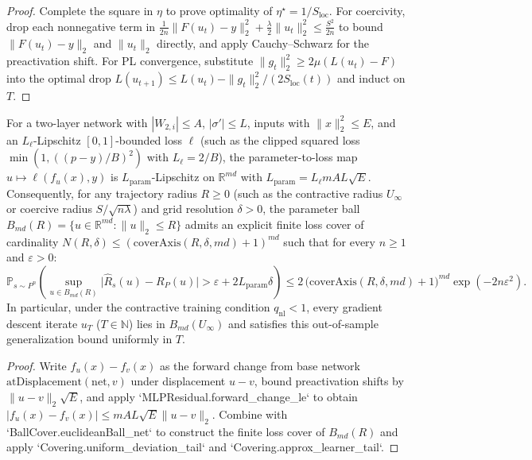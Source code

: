 \begin{proof}
\leanok
Complete the square in $\eta$ to prove optimality of $\eta^\star = 1/S_{\mathrm{loc}}$. For coercivity, drop each nonnegative term in $\frac{1}{2n}\|F(u_t)-y\|_2^2 + \frac{\lambda}{2}\|u_t\|_2^2 \le \frac{S^2}{2n}$ to bound $\|F(u_t)-y\|_2$ and $\|u_t\|_2$ directly, and apply Cauchy--Schwarz for the preactivation shift. For PL convergence, substitute $\|g_t\|_2^2 \ge 2\mu(L(u_t)-F)$ into the optimal drop $L(u_{t+1}) \le L(u_t) - \|g_t\|_2^2/(2 S_{\mathrm{loc}}(t))$ and induct on $T$.
\end{proof}

\begin{lemma}\label{lem:trajectory_generalization}
\leanok
{}
For a two-layer network with $|W_{2,i}|\le A$, $|\sigma'|\le L$, inputs with $\|x\|_2^2\le E$, and an $L_\ell$-Lipschitz $[0,1]$-bounded loss $\ell$ (such as the clipped squared loss $\min(1, ((p-y)/B)^2)$ with $L_\ell = 2/B$), the parameter-to-loss map $u\mapsto \ell(f_{u}(x), y)$ is $L_{\mathrm{param}}$-Lipschitz on $\mathbb{R}^{md}$ with $L_{\mathrm{param}} = L_\ell m A L\sqrt{E}$. Consequently, for any trajectory radius $R\ge 0$ (such as the contractive radius $U_\infty$ or coercive radius $S/\sqrt{n\lambda}$) and grid resolution $\delta>0$, the parameter ball $B_{md}(R) = \{u\in\mathbb{R}^{md} : \|u\|_2\le R\}$ admits an explicit finite loss cover of cardinality $N(R,\delta) \le (\mathrm{coverAxis}(R,\delta,md)+1)^{md}$ such that for every $n\ge 1$ and $\varepsilon>0$:
\[
\mathbb{P}_{s\sim P^n}\!\left(\sup_{u\in B_{md}(R)} \bigl|\widehat{R}_s(u) - R_P(u)\bigr| > \varepsilon + 2 L_{\mathrm{param}}\delta\right)
\le 2\,\bigl(\mathrm{coverAxis}(R,\delta,md)+1\bigr)^{md}\exp(-2n\varepsilon^2).
\]
In particular, under the contractive training condition $q_{\mathrm{nl}}<1$, every gradient descent iterate $u_T$ ($T\in\mathbb{N}$) lies in $B_{md}(U_\infty)$ and satisfies this out-of-sample generalization bound uniformly in $T$.
\end{lemma}
\begin{proof}
\leanok
Write $f_u(x) - f_v(x)$ as the forward change from base network $\mathrm{atDisplacement}(\mathrm{net}, v)$ under displacement $u-v$, bound preactivation shifts by $\|u-v\|_2\sqrt{E}$, and apply `MLPResidual.forward_change_le` to obtain $|f_u(x)-f_v(x)| \le m A L\sqrt{E}\|u-v\|_2$. Combine with `BallCover.euclideanBall_net` to construct the finite loss cover of $B_{md}(R)$ and apply `Covering.uniform_deviation_tail` and `Covering.approx_learner_tail`.
\end{proof}

